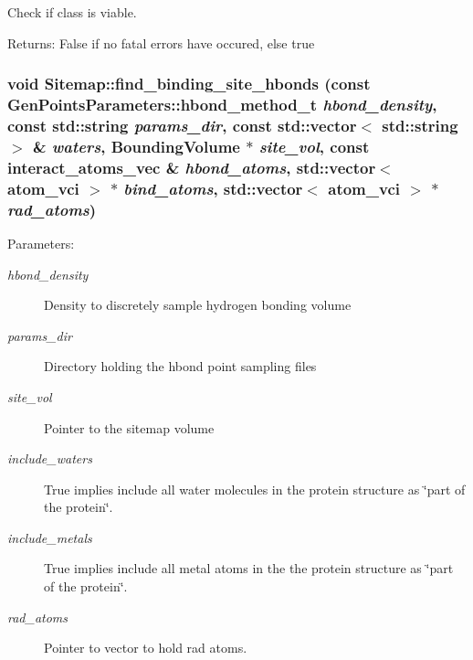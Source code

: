 Check if class is viable. 

\begin{Desc}
\item[Returns:]False if no fatal errors have occured, else true \end{Desc}
\subsubsection{\setlength{\rightskip}{0pt plus 5cm}void Sitemap::find\_\-binding\_\-site\_\-hbonds (const \bf{Gen\-Points\-Parameters::hbond\_\-method\_\-t} {\em hbond\_\-density}, const std::string {\em params\_\-dir}, const std::vector$<$ std::string $>$ \& {\em waters}, \bf{Bounding\-Volume} $\ast$ {\em site\_\-vol}, const interact\_\-atoms\_\-vec \& {\em hbond\_\-atoms}, std::vector$<$ atom\_\-vci $>$ $\ast$ {\em bind\_\-atoms}, std::vector$<$ atom\_\-vci $>$ $\ast$ {\em rad\_\-atoms})\hspace{0.3cm}{\tt  [private]}}\label{classSimSite3D_1_1Sitemap_1c89cc76612ae6e252b459b4bf62bc13}


\begin{Desc}
\item[Parameters:]
\begin{description}
\item[{\em hbond\_\-density}]Density to discretely sample hydrogen bonding volume \item[{\em params\_\-dir}]Directory holding the hbond point sampling files \item[{\em site\_\-vol}]Pointer to the sitemap volume \item[{\em include\_\-waters}]True implies include all water molecules in the protein structure as \char`\"{}part of the protein\char`\"{}. \item[{\em include\_\-metals}]True implies include all metal atoms in the the protein structure as \char`\"{}part of the protein\char`\"{}. \item[{\em rad\_\-atoms}]Pointer to vector to hold rad atoms. \end{description}
\end{Desc}
